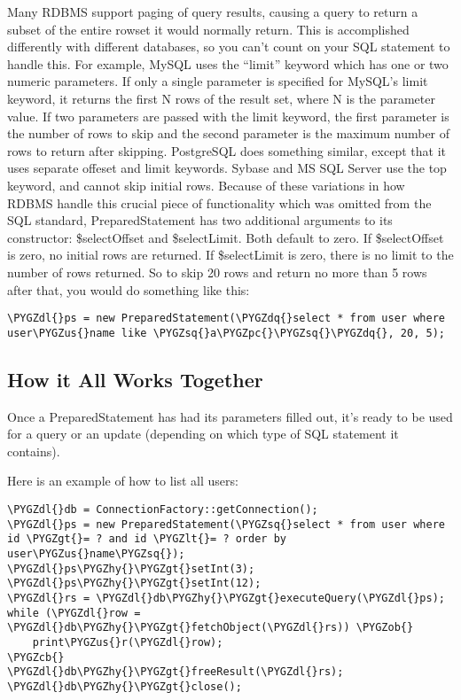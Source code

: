 \documentclass[letterpaper,10pt,english]{sphinxmanual}
\def\PYGZus{\char`\_}
\def\PYGZob{\char`\{}
\def\PYGZcb{\char`\}}
\def\PYGZlt{\char`\<}
\def\PYGZgt{\char`\>}
\def\PYGZpc{\char`\%}
\def\PYGZdl{\char`\$}
\def\PYGZhy{\char`\-}
\def\PYGZsq{\char`\'}
\def\PYGZdq{\char`\"}
\renewcommand\PYGZsq{\textquotesingle}
\begin{document}
Many RDBMS support paging of query results, causing a query to return a subset of the entire rowset
it would normally return.  This is accomplished differently with different databases, so you can't
count on your SQL statement to handle this.  For example, MySQL uses the ``limit'' keyword which has
one or two numeric parameters.  If only a single parameter is specified for MySQL's limit keyword,
it returns the first N rows of the result set, where N is the parameter value.  If two parameters
are passed with the limit keyword, the first parameter is the number of rows to skip and the second
parameter is the maximum number of rows to return after skipping.  PostgreSQL does something
similar, except that it uses separate offeset and limit keywords.  Sybase and MS SQL Server use the
top keyword, and cannot skip initial rows.  Because of these variations in how RDBMS handle this
crucial piece of functionality which was omitted from the SQL standard, PreparedStatement has two
additional arguments to its constructor: \$selectOffset and \$selectLimit.  Both default to zero.  If
\$selectOffset is zero, no initial rows are returned.  If \$selectLimit is zero, there is no limit to
the number of rows returned.  So to skip 20 rows and return no more than 5 rows after that, you
would do something like this:

\begin{Verbatim}[commandchars=\\\{\}]
\PYGZdl{}ps = new PreparedStatement(\PYGZdq{}select * from user where user\PYGZus{}name like \PYGZsq{}a\PYGZpc{}\PYGZsq{}\PYGZdq{}, 20, 5);
\end{Verbatim}


\subsection{How it All Works Together}
\label{jaxFrameworkGuide:how-it-all-works-together}
Once a PreparedStatement has had its parameters filled out, it's ready to be used for a query or an
update (depending on which type of SQL statement it contains).

Here is an example of how to list all users:

\begin{Verbatim}[commandchars=\\\{\}]
\PYGZdl{}db = ConnectionFactory::getConnection();
\PYGZdl{}ps = new PreparedStatement(\PYGZsq{}select * from user where id \PYGZgt{}= ? and id \PYGZlt{}= ? order by user\PYGZus{}name\PYGZsq{});
\PYGZdl{}ps\PYGZhy{}\PYGZgt{}setInt(3);
\PYGZdl{}ps\PYGZhy{}\PYGZgt{}setInt(12);
\PYGZdl{}rs = \PYGZdl{}db\PYGZhy{}\PYGZgt{}executeQuery(\PYGZdl{}ps);
while (\PYGZdl{}row = \PYGZdl{}db\PYGZhy{}\PYGZgt{}fetchObject(\PYGZdl{}rs)) \PYGZob{}
    print\PYGZus{}r(\PYGZdl{}row);
\PYGZcb{}
\PYGZdl{}db\PYGZhy{}\PYGZgt{}freeResult(\PYGZdl{}rs);
\PYGZdl{}db\PYGZhy{}\PYGZgt{}close();
\end{Verbatim}
\end{document}

